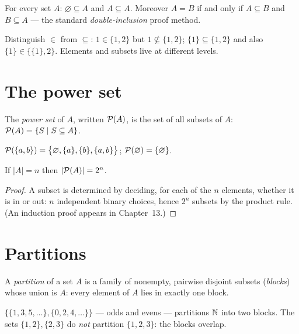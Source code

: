 \begin{theorem}
For every set $A$: $\varnothing \subseteq A$ and $A \subseteq A$. Moreover
$A = B$ if and only if $A \subseteq B$ and $B \subseteq A$ --- the standard
\emph{double-inclusion} proof method.
\end{theorem}

\begin{notebox}
Distinguish $\in$ from $\subseteq$: $1 \in \{1,2\}$ but
$1 \not\subseteq \{1,2\}$; $\{1\} \subseteq \{1,2\}$ and also
$\{1\} \in \{\{1\}, 2\}$. Elements and subsets live at different levels.
\end{notebox}

\section{The power set}

\begin{definition}
The \emph{power set} of $A$, written $\mathcal{P}(A)$, is the set of all subsets
of $A$:\ $\mathcal{P}(A) = \{S \mid S \subseteq A\}$.
\end{definition}

\begin{example}
$\mathcal{P}(\{a,b\}) = \bigl\{\varnothing, \{a\}, \{b\}, \{a,b\}\bigr\}$;
$\mathcal{P}(\varnothing) = \{\varnothing\}$.
\end{example}

\begin{theorem}\label{thm:powerset}
If $|A| = n$ then $|\mathcal{P}(A)| = 2^n$.
\end{theorem}

\begin{proof}
A subset is determined by deciding, for each of the $n$ elements,
whether it is in or out: $n$ independent binary choices, hence
$2^n$ subsets by the product rule. (An induction proof appears in
Chapter~13.)
\end{proof}

\section{Partitions}

\begin{definition}
A \emph{partition} of a set $A$ is a family of nonempty, pairwise disjoint
subsets (\emph{blocks}) whose union is $A$: every element of $A$ lies in
exactly one block.
\end{definition}

\begin{example}
$\bigl\{\{1,3,5,\dots\}, \{0,2,4,\dots\}\bigr\}$ --- odds and evens ---
partitions $\mathbb{N}$ into two blocks. The sets $\{1,2\},\{2,3\}$ do \emph{not}
partition $\{1,2,3\}$: the blocks overlap.
\end{example}

